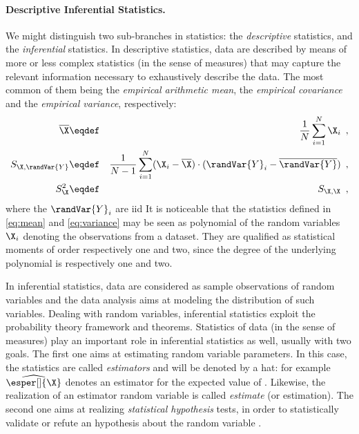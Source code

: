 \paragraph{Descriptive \vs{} Inferential Statistics.}
We might distinguish two sub-branches in statistics: the \emph{descriptive} statistics, and the \emph{inferential} statistics.
In descriptive statistics, data are described by means of more or less complex statistics (in the sense of measures) that may capture the relevant information necessary to exhaustively describe the data. 
The most common of them being the \emph{empirical arithmetic mean}, the \emph{empirical covariance} and the \emph{empirical variance}, respectively:
\begin{eqnarray}
    \label{eq:mean}
    \overline{\X} & \eqdef & \frac{1}{N} \sum_{i=1}^N \X_i \enspace , \\
    \label{eq:covariance}
    S_{\X, \randVar{Y}} & \eqdef & \frac{1}{N-1} \sum_{i=1}^N (\X_i - \overline{\X}) \cdot (\randVar{Y}_i - \overline{\randVar{Y}}) \enspace , \\
    \label{eq:variance}
    S_{\X}^2 & \eqdef & S_{\X, \X} \enspace ,
\end{eqnarray}
where the \(\randVar{Y}_i\) are \gls{iid}
It is noticeable that the statistics defined in \autoref{eq:mean} and \autoref{eq:variance} may be seen as polynomial of the random variables \(\X_i\) denoting the observations from a dataset.
They are qualified as statistical moments of order respectively one and two, since the degree of the underlying polynomial is respectively one and two.

In inferential statistics, data are considered as sample observations of random variables and the data analysis aims at modeling the distribution of such variables.
Dealing with random variables, inferential statistics exploit the probability theory framework and theorems.
Statistics of data (in the sense of measures) play an important role in inferential statistics as well, usually with two goals.
The first one aims at estimating random variable parameters.
In this case, the statistics are called \emph{estimators} and will be denoted by a hat: for example \(\widehat{\esper[]{\X}}\) denotes an estimator for the expected value of \X.
Likewise, the realization of an estimator random variable is called \emph{estimate} (or estimation).
The second one aims at realizing \emph{statistical hypothesis} tests, in order to statistically validate or refute an hypothesis about the random variable \X.

